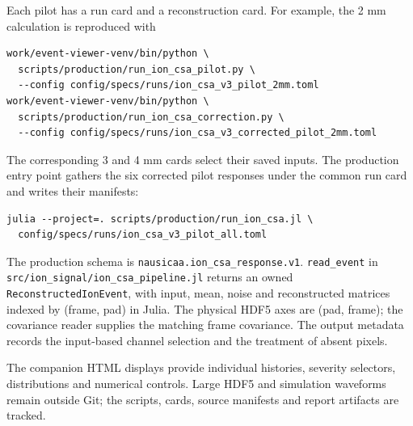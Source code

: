 \documentclass[11pt,a4paper]{article}
\begin{document}
Each pilot has a run card and a reconstruction card. For example, the 2 mm
calculation is reproduced with
\begin{verbatim}
work/event-viewer-venv/bin/python \
  scripts/production/run_ion_csa_pilot.py \
  --config config/specs/runs/ion_csa_v3_pilot_2mm.toml
work/event-viewer-venv/bin/python \
  scripts/production/run_ion_csa_correction.py \
  --config config/specs/runs/ion_csa_v3_corrected_pilot_2mm.toml
\end{verbatim}
The corresponding 3 and 4 mm cards select their saved inputs. The production
entry point gathers the six corrected pilot responses under the common run
card and writes their manifests:
\begin{verbatim}
julia --project=. scripts/production/run_ion_csa.jl \
  config/specs/runs/ion_csa_v3_pilot_all.toml
\end{verbatim}
The production schema is \texttt{nausicaa.ion\_csa\_response.v1}.
\texttt{read\_event} in \texttt{src/ion\_signal/ion\_csa\_pipeline.jl}
returns an owned \texttt{ReconstructedIonEvent}, with input, mean, noise and
reconstructed matrices indexed by (frame, pad) in Julia. The physical HDF5
axes are (pad, frame); the covariance reader supplies the matching frame
covariance. The output metadata records the input-based channel selection
and the treatment of absent pixels.

The companion HTML displays provide individual histories, severity selectors,
distributions and numerical controls. Large HDF5 and simulation waveforms remain outside
Git; the scripts, cards, source manifests and report artifacts are tracked.


\IfFileExists{references.bib}{}{}
\end{document}
